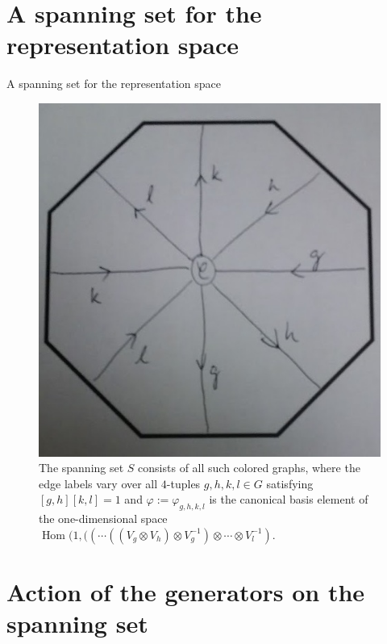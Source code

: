 \documentclass{beamer}
\newcommand{\ph}{\varphi}
\DeclareMathOperator{\Hom}{Hom}
\begin{document}
\section{A spanning set for the representation space}

\begin{frame}{A spanning set for the representation space}
\begin{figure}[h]
\centering
\includegraphics[height=0.5\textheight]{basis.jpg}
\caption{The spanning set $S$ consists of all such colored graphs, where the edge labels vary over all $4$-tuples $g,h,k,l \in G$ satisfying $[g,h][k,l] = 1$ and $\ph := \ph_{g,h,k,l}$ is the canonical basis element of the one-dimensional space $\Hom(1, (( \cdots ((V_g \otimes V_h) \otimes V_g^{-1}) \otimes \cdots \otimes V_l^{-1})$.}
\end{figure}
\end{frame}


\section{Action of the generators on the spanning set}
\end{document}
